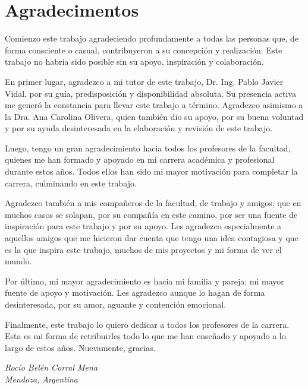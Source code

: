 \chapter*{Agradecimentos}

Comienzo este trabajo agradeciendo profundamente a todas las personas que, de forma consciente o casual, contribuyeron a su concepción y realización. Este trabajo no habría sido posible sin su apoyo, inspiración y colaboración.

En primer lugar, agradezco a mi tutor de este trabajo, Dr. Ing. Pablo Javier Vidal, por su guía, predisposición y disponibilidad absoluta. Su presencia activa me generó la constancia para llevar este trabajo a término. Agradezco asimismo a la Dra. Ana Carolina Olivera, quien también dio su apoyo, por su buena voluntad y por su ayuda desinteresada en la elaboración y revisión de este trabajo.

Luego, tengo un gran agradecimiento hacia todos los profesores de la facultad, quienes me han formado y apoyado en mi carrera académica y profesional durante estos años. Todos ellos han sido mi mayor motivación para completar la carrera, culminando en este trabajo.

Agradezco también a mis compañeros de la facultad, de trabajo y amigos, que en muchos casos se solapan, por su compañía en este camino, por ser una fuente de inspiración para este trabajo y por su apoyo. Les agradezco especialmente a aquellos amigos que me hicieron dar cuenta que tengo una idea contagiosa y que es la que inspira este trabajo, muchos de mis proyectos y mi forma de ver el mundo.

Por último, mi mayor agradecimiento es hacia mi familia y pareja: mi mayor fuente de apoyo y motivación. Les agradezco aunque lo hagan de forma desinteresada, por su amor, aguante y contención emocional.

Finalmente, este trabajo lo quiero dedicar a todos los profesores de la carrera. Esta es mi forma de retribuirles todo lo que me han enseñado y apoyado a lo largo de estos años. Nuevamente, gracias.

\begin{flushright}
  \textit{Rocío Belén Corral Mena} \\
  \textit{Mendoza, Argentina} \\
  \textit{\DTMMonthname{\month} \number\year}
\end{flushright}

